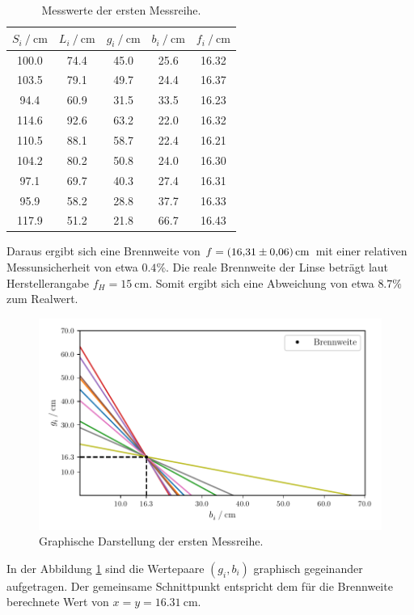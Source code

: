 \begin{table}
    \centering
    \caption{Messwerte der ersten Messreihe.}
    \begin{tabular}{c c c c c}
        \toprule
        {$S_i \:/\: \si{\centi\meter}$} & {$L_i \:/\: \si{\centi\meter}$} & {$g_i \:/\: \si{\centi\meter}$} & {$b_i \:/\: \si{\centi\meter}$} & {$f_i \:/\: \si{\centi\meter}$}\\
        \midrule
        100.0    & 74.4 & 45.0 & 25.6 & 16.32 \\
        103.5    & 79.1 & 49.7 & 24.4 & 16.37 \\
        94.4     & 60.9 & 31.5 & 33.5 & 16.23 \\
        114.6    & 92.6 & 63.2 & 22.0 & 16.32 \\
        110.5    & 88.1 & 58.7 & 22.4 & 16.21 \\
        104.2    & 80.2 & 50.8 & 24.0 & 16.30 \\
        97.1     & 69.7 & 40.3 & 27.4 & 16.31 \\
        95.9     & 58.2 & 28.8 & 37.7 & 16.33 \\
        117.9    & 51.2 & 21.8 & 66.7 & 16.43 \\
    \end{tabular}
    \label{tab:mess1}
\end{table}

Daraus ergibt sich eine Brennweite von $f = \SI{16.31\pm0.06}{\centi\meter}$ mit einer relativen Messunsicherheit von etwa $0.4\%$.
Die reale Brennweite der Linse beträgt laut Herstellerangabe $f_H = \SI{15}{\centi\meter}$. Somit ergibt sich eine Abweichung von etwa $8.7\%$ zum Realwert.

\begin{figure}
    \centering
    \includegraphics[width=.9\textwidth]{python/plot1.pdf}
    \caption{Graphische Darstellung der ersten Messreihe.}
    \label{fig:fokus}
\end{figure}
In der Abbildung \ref{fig:fokus} sind die Wertepaare $(g_i, b_i)$ graphisch gegeinander aufgetragen. Der gemeinsame Schnittpunkt entspricht dem für die Brennweite berechnete Wert von 
$x = y = \SI{16.31}{\centi\meter}$.

